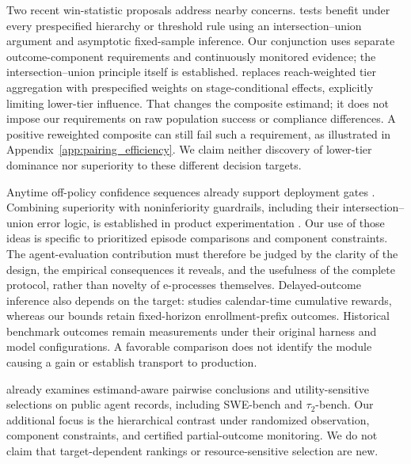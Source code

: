 \documentclass{article}
\begin{document}
Two recent win-statistic proposals address nearby concerns.
\citet{li2026worstcase} tests benefit under every prespecified hierarchy
or threshold rule using an intersection--union argument and asymptotic
fixed-sample inference. Our conjunction uses separate outcome-component
requirements and continuously monitored evidence; the intersection--union
principle itself is established. \citet{mccoy2026psnb} replaces
reach-weighted tier aggregation with prespecified weights on
stage-conditional effects, explicitly limiting lower-tier influence.
That changes the composite estimand; it does not impose our requirements
on raw population success or compliance differences. A positive
reweighted composite can still fail such a requirement, as illustrated
in Appendix~\ref{app:pairing_efficiency}. We claim neither discovery of
lower-tier dominance nor superiority to these different decision targets.

Anytime off-policy confidence sequences already support deployment gates
\citep{karampatziakis2021offpolicy}. Combining superiority with
noninferiority guardrails, including their intersection--union error
logic, is established in product experimentation
\citep{schultzberg2024riskaware}. Our use of those ideas is specific to
prioritized episode comparisons and component constraints. The
agent-evaluation contribution must therefore be judged by the clarity
of the design, the empirical consequences it reveals, and the usefulness
of the complete protocol, rather than novelty of e-processes themselves.
Delayed-outcome inference also depends on the target:
\citet{lindon2026delayed} studies calendar-time cumulative rewards,
whereas our bounds retain fixed-horizon enrollment-prefix outcomes.
Historical benchmark outcomes remain measurements under their original
harness and model configurations. A favorable comparison does not
identify the module causing a gain or establish transport to production.

\citet{huang2026leaderboard} already examines estimand-aware pairwise
conclusions and utility-sensitive selections on public agent records,
including SWE-bench and $\tau_2$-bench. Our additional focus is the
hierarchical contrast under randomized observation, component constraints,
and certified partial-outcome monitoring. We do not claim that
target-dependent rankings or resource-sensitive selection are new.
\end{document}
